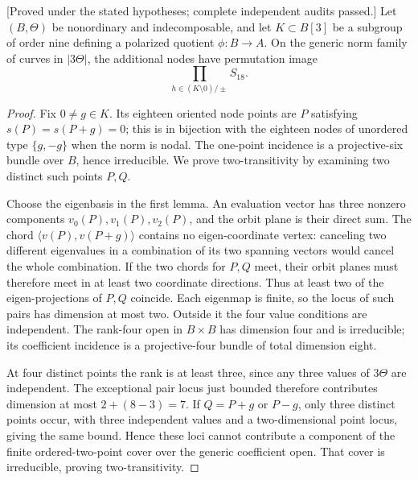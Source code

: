 \begin{proposition}
\label{prop:nonordinary-three-torsion-node-product-candidate}
\textup{[Proved under the stated hypotheses; complete independent audits passed.]}
Let $(B,\Theta)$ be nonordinary and indecomposable, and let
$K\subset B[3]$ be a subgroup of order nine defining a polarized
quotient $\phi:B\to A$. On the generic norm family of curves in
$|3\Theta|$, the additional nodes have permutation image
\[
                      \prod_{h\in(K\setminus0)/\pm} S_{18}.
\]
\end{proposition}
\begin{proof}
Fix $0\ne g\in K$. Its eighteen oriented node points are
$P$ satisfying $s(P)=s(P+g)=0$; this is in bijection with the
eighteen nodes of unordered type $\{g,-g\}$ when the norm is
nodal. The one-point incidence is a projective-six bundle over
$B$, hence irreducible. We prove two-transitivity by examining
two distinct such points $P,Q$.

Choose the eigenbasis in the first lemma. An evaluation vector
has three nonzero components $v_0(P),v_1(P),v_2(P)$, and the
orbit plane is their direct sum. The chord
$\langle v(P),v(P+g)\rangle$ contains no eigen-coordinate vertex:
canceling two different eigenvalues in a combination of its
two spanning vectors would cancel the whole combination.
If the two chords for $P,Q$ meet, their orbit planes must
therefore meet in at least two coordinate directions. Thus at
least two of the eigen-projections of $P,Q$ coincide. Each
eigenmap is finite, so the locus of such pairs has dimension
at most two. Outside it the four value conditions are
independent. The rank-four open in $B\times B$ has dimension
four and is irreducible; its coefficient incidence is a
projective-four bundle of total dimension eight.

At four distinct points the rank is at least three, since any
three values of $3\Theta$ are independent. The exceptional
pair locus just bounded therefore contributes dimension at
most $2+(8-3)=7$. If $Q=P+g$ or $P-g$, only three distinct
points occur, with three independent values and a two-dimensional
point locus, giving the same bound. Hence these loci cannot
contribute a component of the finite \etale ordered-two-point
cover over the generic coefficient open. That cover is
irreducible, proving two-transitivity.


\end{proof}
